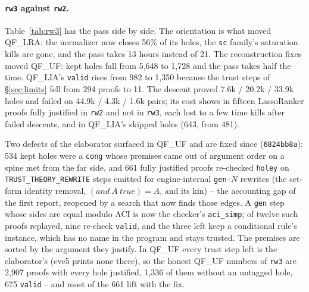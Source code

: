 \documentclass[11pt,a4paper]{article}
\newcommand{\UF}{QF\_UF}
\newcommand{\LIA}{QF\_LIA}
\newcommand{\LRA}{QF\_LRA}
\newcommand{\code}[1]{\texttt{#1}}
\begin{document}
\paragraph{\code{rw3} against \code{rw2}.} Table~\ref{tab:rw3} has the pass
side by side. The orientation is what moved \LRA{}: the normalizer now
closes 56\% of its holes, the \code{sc} family's saturation kills are gone,
and the pass takes 13 hours instead of 21. The reconstruction fixes moved
\UF{}: kept holes fall from 5,648 to 1,728 and the pass takes half the
time. \LIA{}'s \code{valid} rises from 982 to 1,350 because the trust steps
of \S\ref{sec:limits} fell from 294 proofs to 11. The descent proved
7.6k / 20.2k / 33.9k holes and failed on 44.9k / 4.3k / 1.6k pairs; its
cost shows in fifteen LassoRanker proofs fully justified in \code{rw2} and
not in \code{rw3}, each lost to a few time kills after failed descents,
and in \LIA{}'s skipped holes (643, from 481).

\begin{table}[htbp]\centering\footnotesize
\resizebox{\textwidth}{!}{}
\caption{\code{rw3} against \code{rw2}, holes of the proofs that ran the
  pass. ``trust steps left'' counts the fully justified proofs without an
  untagged hole that still re-check \code{holey} on a step the elaborator
  emitted.}\label{tab:rw3}
\end{table}

Two defects of the elaborator surfaced in \UF{} and are fixed since
(\code{6824bb8a}): 534 kept holes were a \code{cong} whose premises came
out of argument order on a spine met from the far side, and 661 fully
justified proofs re-checked \code{holey} on \code{TRUST\_THEORY\_REWRITE}
steps emitted for engine-internal \code{gen-}$N$ rewrites (the set-form
identity removal, $(\mathit{and}\ A\ \mathit{true}) = A$, and its kin) --
the accounting gap of the first report, reopened by a search that now finds
those edges. A \code{gen} step whose sides are equal modulo ACI is now the
checker's \code{aci\_simp}; of twelve such proofs replayed, nine re-check
\code{valid}, and the three left keep a conditional rule's instance, which
has no name in the program and stays trusted. The premises are sorted by the
argument they justify. In \UF{} every trust step left is the elaborator's
(cvc5 prints none there), so the honest \UF{} numbers of \code{rw3} are
2,907 proofs with every hole justified, 1,336 of them without an untagged
hole, 675 \code{valid} -- and most of the 661 lift with the fix.
\end{document}

